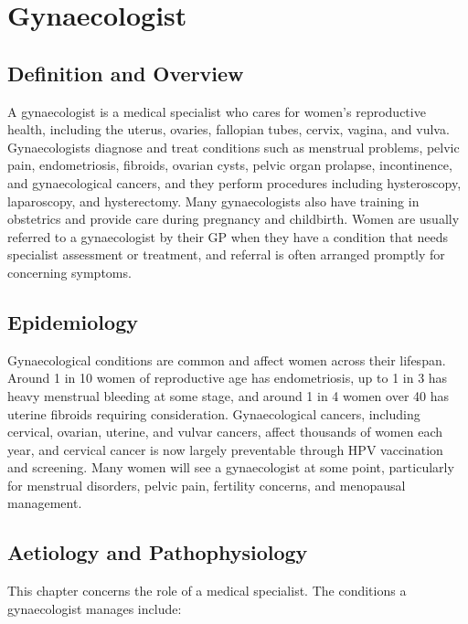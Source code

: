 \chapter{Gynaecologist}

\section*{Definition and Overview}
A gynaecologist is a medical specialist who cares for women's reproductive health, including the uterus, ovaries, fallopian tubes, cervix, vagina, and vulva. Gynaecologists diagnose and treat conditions such as menstrual problems, pelvic pain, endometriosis, fibroids, ovarian cysts, pelvic organ prolapse, incontinence, and gynaecological cancers, and they perform procedures including hysteroscopy, laparoscopy, and hysterectomy. Many gynaecologists also have training in obstetrics and provide care during pregnancy and childbirth. Women are usually referred to a gynaecologist by their GP when they have a condition that needs specialist assessment or treatment, and referral is often arranged promptly for concerning symptoms.

\section*{Epidemiology}
Gynaecological conditions are common and affect women across their lifespan. Around 1 in 10 women of reproductive age has endometriosis, up to 1 in 3 has heavy menstrual bleeding at some stage, and around 1 in 4 women over 40 has uterine fibroids requiring consideration. Gynaecological cancers, including cervical, ovarian, uterine, and vulvar cancers, affect thousands of women each year, and cervical cancer is now largely preventable through HPV vaccination and screening. Many women will see a gynaecologist at some point, particularly for menstrual disorders, pelvic pain, fertility concerns, and menopausal management.

\section*{Aetiology and Pathophysiology}
This chapter concerns the role of a medical specialist. The conditions a gynaecologist manages include:

